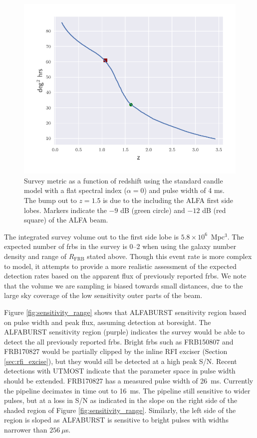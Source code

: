 \documentclass[a4paper,fleqn,usenatbib]{mnras}
\begin{document}
\begin{figure}
    \includegraphics[width=1.0\linewidth]{figures/full_sefd_z_relation.pdf}
    \caption{Survey metric as a function of redshift using the standard candle
    model with a flat spectral index ($\alpha=0$) and pulse width of 4 ms. The
    bump out to $z=1.5$ is due to the including the ALFA first side lobes.
    Markers indicate the $-9$ dB (green circle) and $-12$ dB (red square) of the
    ALFA beam.
    }
    \label{fig:full_sefd_z}
\end{figure}

The integrated survey volume out to the first side lobe is $5.8 \times
10^6$~Mpc$^3$. The expected number of \glspl{frb} in the survey is
0--2 when using the galaxy number density and range of $R_{\textrm{FRB}}$
stated above. Though this event rate is more complex to model, it attempts
to provide a more realistic assessment of the expected detection rates
based on the apparent flux of previously reported \glspl{frb}. We note
that the volume we are sampling is biased towards small distances, due
to the large sky coverage of the low sensitivity outer parts of the
beam.

Figure \ref{fig:sensitivity_range} shows that ALFABURST sensitivity region
based on pulse width and peak flux, assuming detection at boresight. The
ALFABURST sensitivity region (purple) indicates the survey would be able to
detect the all previously reported \glspl{frb}. Bright \glspl{frb} such as
FRB150807 and FRB170827 would be partially clipped by the inline RFI exciser
(Section \ref{sec:rfi_excise}), but they would sill be detected at a high peak
S/N.  Recent detections with UTMOST
\citep{2017MNRAS.468.3746C,atel10697,atel10867} indicate that the parameter
space in pulse width should be extended.  FRB170827 has a measured pulse width
of 26~ms. Currently the pipeline decimates in time out to 16~ms. The pipeline
still sensitive to wider pulses, but at a loss in S/N as indicated in the slope
on the right side of the shaded region of Figure \ref{fig:sensitivity_range}.
Similarly, the left side of the region is sloped as ALFABURST is sensitive to
bright pulses with widths narrower than $256~\mu$s.
\end{document}
